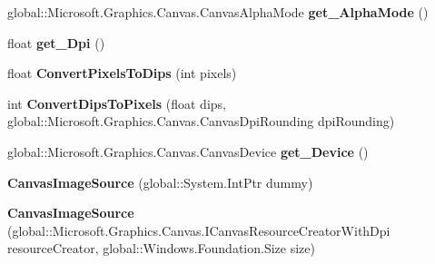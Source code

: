 \begin{DoxyCompactItemize}
global\+::\+Microsoft.\+Graphics.\+Canvas.\+Canvas\+Alpha\+Mode {\bfseries get\+\_\+\+Alpha\+Mode} ()
\item 
\mbox{\label{class_microsoft_1_1_graphics_1_1_canvas_1_1_u_i_1_1_xaml_1_1_canvas_image_source_acab54624adff2f4ef719b6d792103ab8}} 
float {\bfseries get\+\_\+\+Dpi} ()
\item 
\mbox{\label{class_microsoft_1_1_graphics_1_1_canvas_1_1_u_i_1_1_xaml_1_1_canvas_image_source_a7a73b33b06b461575d0599cc9586b78e}} 
float {\bfseries Convert\+Pixels\+To\+Dips} (int pixels)
\item 
\mbox{\label{class_microsoft_1_1_graphics_1_1_canvas_1_1_u_i_1_1_xaml_1_1_canvas_image_source_a5527b19721b109df85d06d449a3d6f6a}} 
int {\bfseries Convert\+Dips\+To\+Pixels} (float dips, global\+::\+Microsoft.\+Graphics.\+Canvas.\+Canvas\+Dpi\+Rounding dpi\+Rounding)
\item 
\mbox{\label{class_microsoft_1_1_graphics_1_1_canvas_1_1_u_i_1_1_xaml_1_1_canvas_image_source_aab3581e1ce35b89a948dc0025e5aaa14}} 
global\+::\+Microsoft.\+Graphics.\+Canvas.\+Canvas\+Device {\bfseries get\+\_\+\+Device} ()
\item 
\mbox{\label{class_microsoft_1_1_graphics_1_1_canvas_1_1_u_i_1_1_xaml_1_1_canvas_image_source_a274b866a61b2dc07e5c6c8ab2510ac87}} 
{\bfseries Canvas\+Image\+Source} (global\+::\+System.\+Int\+Ptr dummy)
\item 
\mbox{\label{class_microsoft_1_1_graphics_1_1_canvas_1_1_u_i_1_1_xaml_1_1_canvas_image_source_a9eb6e499e761bca49e7066fd004cac4a}} 
{\bfseries Canvas\+Image\+Source} (global\+::\+Microsoft.\+Graphics.\+Canvas.\+I\+Canvas\+Resource\+Creator\+With\+Dpi resource\+Creator, global\+::\+Windows.\+Foundation.\+Size size)
\item 
\mbox{\label{class_microsoft_1_1_graphics_1_1_canvas_1_1_u_i_1_1_xaml_1_1_canvas_image_source_a59470b76c2a432e8d723603569f5e5bf}} 

\end{DoxyCompactItemize}
